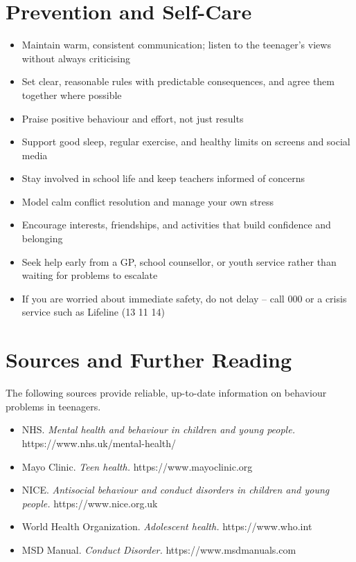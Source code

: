 \section*{Prevention and Self-Care}
\begin{itemize}
    \item Maintain warm, consistent communication; listen to the teenager's views without always criticising
    \item Set clear, reasonable rules with predictable consequences, and agree them together where possible
    \item Praise positive behaviour and effort, not just results
    \item Support good sleep, regular exercise, and healthy limits on screens and social media
    \item Stay involved in school life and keep teachers informed of concerns
    \item Model calm conflict resolution and manage your own stress
    \item Encourage interests, friendships, and activities that build confidence and belonging
    \item Seek help early from a GP, school counsellor, or youth service rather than waiting for problems to escalate
    \item If you are worried about immediate safety, do not delay -- call 000 or a crisis service such as Lifeline (13 11 14)
\end{itemize}

\section*{Sources and Further Reading}
The following sources provide reliable, up-to-date information on behaviour problems in teenagers.
\begin{itemize}
    \item NHS. \textit{Mental health and behaviour in children and young people.} https://www.nhs.uk/mental-health/
    \item Mayo Clinic. \textit{Teen health.} https://www.mayoclinic.org
    \item NICE. \textit{Antisocial behaviour and conduct disorders in children and young people.} https://www.nice.org.uk
    \item World Health Organization. \textit{Adolescent health.} https://www.who.int
    \item MSD Manual. \textit{Conduct Disorder.} https://www.msdmanuals.com
\end{itemize}
